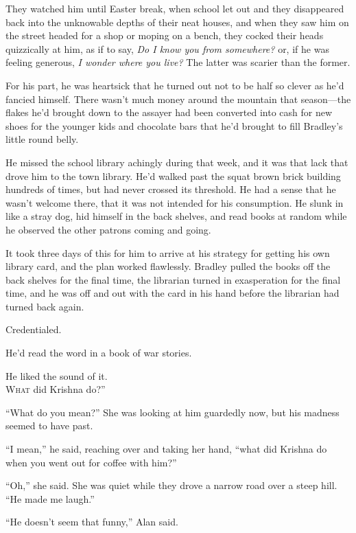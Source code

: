 They watched him until Easter break, when school let out and they
disappeared back into the unknowable depths of their neat houses, and
when they saw him on the street headed for a shop or moping on a
bench, they cocked their heads quizzically at him, as if to say,
\textit{Do I know you from somewhere?} or, if he was feeling generous,
\textit{I wonder where you live?} The latter was scarier than the
former.

For his part, he was heartsick that he turned out not to be half so
clever as he'd fancied himself.  There wasn't much money around the
mountain that season---the flakes he'd brought down to the assayer had
been converted into cash for new shoes for the younger kids and
chocolate bars that he'd brought to fill Bradley's little round belly.

He missed the school library achingly during that week, and it was
that lack that drove him to the town library.  He'd walked past the
squat brown brick building hundreds of times, but had never crossed
its threshold.  He had a sense that he wasn't welcome there, that it
was not intended for his consumption.  He slunk in like a stray dog,
hid himself in the back shelves, and read books at random while he
observed the other patrons coming and going.

It took three days of this for him to arrive at his strategy for
getting his own library card, and the plan worked flawlessly.  Bradley
pulled the books off the back shelves for the final time, the
librarian turned in exasperation for the final time, and he was off
and out with the card in his hand before the librarian had turned back
again.

Credentialed.

He'd read the word in a book of war stories.

He liked the sound of it.
\\
\lettrine[lines=3, lhang=.5, nindent=0pt, findent=2pt]{W}{hat}
did Krishna do?''

``What do you mean?'' She was looking at him guardedly now, but his
madness seemed to have past.

``I mean,'' he said, reaching over and taking her hand, ``what did
Krishna do when you went out for coffee with him?''

``Oh,'' she said.  She was quiet while they drove a narrow road over a
steep hill.  ``He made me laugh.''

``He doesn't seem that funny,'' Alan said.

